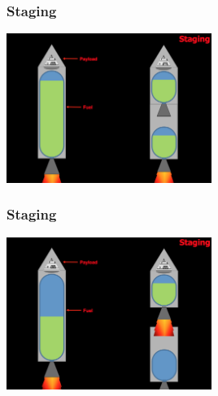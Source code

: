 \begin{frame}
    \frametitle{Staging}
    \begin{block}{}
        \begin{center}
            \includegraphics[width=0.5\textwidth]{images/staging1.png}
        \end{center}
    \end{block}
\end{frame}
\begin{frame}
    \frametitle{Staging}
    \begin{block}{}
        \begin{center}
            \includegraphics[width=0.5\textwidth]{images/staging2.png}
        \end{center}
    \end{block}
\end{frame}

